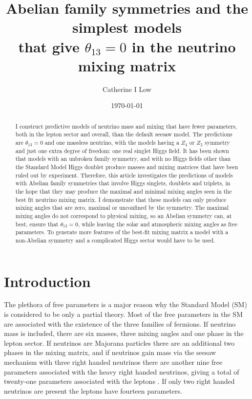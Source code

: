 \documentclass[nofootinbib,showpacs]{revtex4}
\begin{document}
\title{Abelian family symmetries and the simplest models \\ that give $\theta_{13}=0$ in the neutrino mixing matrix}

\author{Catherine I Low} 
\date{\today}

\begin{abstract}
I construct predictive models of neutrino mass and mixing that have fewer parameters, both in the lepton sector and overall, than the default seesaw model. The predictions are $\theta_{13}=0$ and one massless neutrino, with the models having a $Z_4$ or $Z_2$ symmetry and just one extra degree of freedom: one real singlet Higgs field.
It has been shown that models with an unbroken family symmetry, and with no Higgs fields other than the Standard Model Higgs doublet produce masses and mixing matrices that have been ruled out by experiment. Therefore, this article investigates the predictions of models with Abelian family symmetries that involve Higgs singlets, doublets and triplets, in the hope that they may produce the maximal and minimal mixing angles seen in the best fit neutrino mixing matrix. I demonstrate that these models can only produce mixing angles that are zero, maximal or unconfined by the symmetry. The maximal mixing angles do not correspond to physical mixing, so an Abelian symmetry can, at best, ensure that $\theta_{13}=0$, while leaving the solar and atmospheric mixing angles as free parameters. 
To generate more features of the best-fit mixing matrix a model with a non-Abelian symmetry and a complicated Higgs sector would have to be used. 
\end{abstract}


\maketitle

\section{Introduction}


The plethora of free parameters is a major reason why the Standard Model (SM) is considered to be only a partial theory. 
Most of the free parameters in the SM are associated with the existence of the three families of fermions. If neutrino mass is included, there are six masses, three mixing angles and one phase in the lepton sector. If neutrinos are Majorana particles there are an additional two phases in the mixing matrix, and if neutrinos gain mass via the seesaw mechanism \cite{seesaw1,seesaw2,seesaw3,seesaw4,seesaw5} with three right handed neutrinos there are another nine free parameters associated with the heavy right handed neutrinos, giving a total of twenty-one parameters associated with the leptons \cite{santamaria,jenkins}. 
If only two right handed neutrinos are present the leptons have fourteen parameters.   
\end{document}
